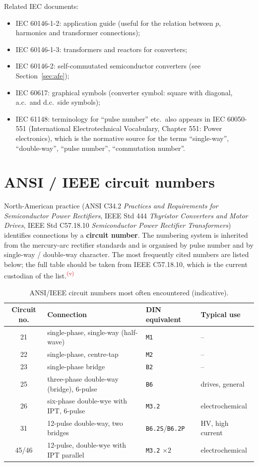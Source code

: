 \documentclass[11pt,a4paper]{article}
\newcommand{\code}[1]{\texttt{#1}}
\newcommand{\verify}{\textsuperscript{\textcolor{red}{(v)}}}
\begin{document}
Related IEC documents:
\begin{itemize}
\item IEC 60146-1-2: application guide (useful for the relation between $p$, harmonics and transformer connections);
\item IEC 60146-1-3: transformers and reactors for converters;
\item IEC 60146-2: self-commutated semiconductor converters (see Section~\ref{sec:afe});
\item IEC 60617: graphical symbols (converter symbol: square with diagonal, a.c.\ and d.c.\ side symbols);
\item IEC 61148: terminology for ``pulse number'' etc.\ also appears in IEC 60050-551 (International Electrotechnical Vocabulary, Chapter 551: Power electronics), which is the normative source for the terms ``single-way'', ``double-way'', ``pulse number'', ``commutation number''.
\end{itemize}

\section{ANSI / IEEE circuit numbers}

North-American practice (ANSI C34.2 \emph{Practices and Requirements for Semiconductor Power Rectifiers}, IEEE Std 444 \emph{Thyristor Converters and Motor Drives}, IEEE Std C57.18.10 \emph{Semiconductor Power Rectifier Transformers}) identifies connections by a \textbf{circuit number}. The numbering system is inherited from the mercury-arc rectifier standards and is organised by pulse number and by single-way / double-way character. The most frequently cited numbers are listed below; the full table should be taken from IEEE C57.18.10, which is the current custodian of the list.\verify

\begin{table}[htb]
\centering
\caption{ANSI/IEEE circuit numbers most often encountered (indicative).}
\begin{tabular}{clll}
\toprule
Circuit no. & Connection & DIN equivalent & Typical use \\
\midrule
21 & single-phase, single-way (half-wave)      & \code{M1} & -- \\
22 & single-phase, centre-tap                 & \code{M2} & -- \\
23 & single-phase bridge                      & \code{B2} & -- \\
25 & three-phase double-way (bridge), 6-pulse & \code{B6} & drives, general \\
26 & six-phase double-wye with IPT, 6-pulse   & \code{M3.2} & electrochemical \\
31 & 12-pulse double-way, two bridges         & \code{B6.2S}/\code{B6.2P} & HV, high current \\
45/46 & 12-pulse, double-wye with IPT parallel & \code{M3.2} $\times 2$ & electrochemical \\
\bottomrule
\end{tabular}
\end{table}
\end{document}
